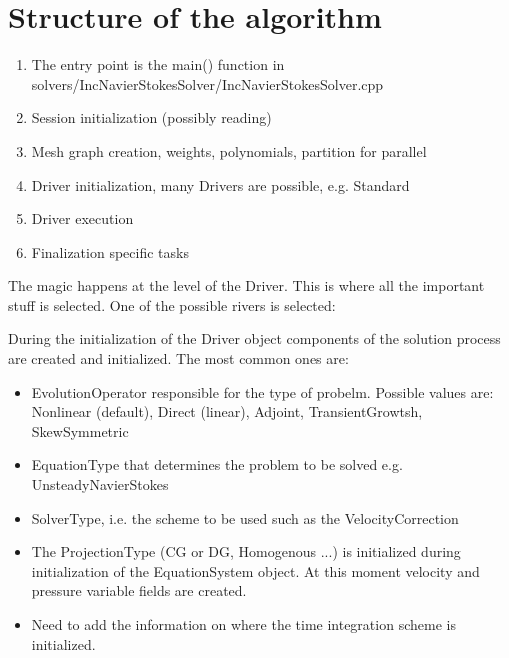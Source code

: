 \section{Structure of the algorithm}


\begin{enumerate}
    \item The entry point is the main() function in solvers/IncNavierStokesSolver/IncNavierStokesSolver.cpp
    \item Session initialization (possibly reading)
    \item Mesh graph creation, weights, polynomials, partition for parallel
    \item Driver initialization, many Drivers are possible, e.g. Standard
    \item Driver execution
    \item Finalization specific tasks
\end{enumerate}

The magic happens at the level of the Driver.
This is where all the important stuff is selected.
One of the possible rivers is selected:
\begin{figure}
\centering

\end{figure}

During the initialization of the Driver object components of the solution process are created and initialized.
The most common ones are:
\begin{itemize}
    \item EvolutionOperator responsible for the type of probelm. Possible values are:
    Nonlinear (default), Direct (linear), Adjoint, TransientGrowtsh, SkewSymmetric
    \item EquationType that determines the problem to be solved e.g. UnsteadyNavierStokes
    \item SolverType, i.e. the scheme to be used such as the VelocityCorrection
    \item The ProjectionType (CG or DG, Homogenous ...)
    is initialized during initialization of the EquationSystem object.
    At this moment velocity and pressure variable fields are created.
    \item Need to add the information on where the time integration scheme is initialized.
\end{itemize}

